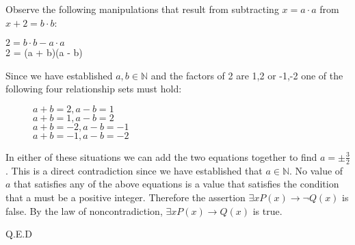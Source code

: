 Observe the following manipulations that result from subtracting $x=a\cdot a$ from $x+2=b\cdot b$: 
\begin{center}
$2 = b\cdot b - a\cdot a$ \\
2 = (a + b)(a - b)
\end{center}
Since we have established $a,b \in \mathbb{N}$ and the factors of 2 are 1,2 or -1,-2 one of the following four relationship sets must hold:
\begin{figure}[H]
\begin{center}
$a+b = 2, a-b = 1$ \\
$a+b = 1, a-b = 2$ \\
$a+b = -2, a-b = -1$ \\
$a+b = -1, a-b = -2$ \\
\end{center}
\end{figure}
In either of these situations we can add the two equations together to find $a = \pm \frac{3}{2}$. This is a direct contradiction since we have established that $a \in \mathbb{N}$. No value of $a$ that satisfies any of the above equations is a value that satisfies the condition that a must be a positive integer. Therefore the assertion $\exists x P(x) \rightarrow \lnot Q(x)$ is false. By the law of noncontradiction, $\exists x P(x) \rightarrow Q(x)$ is true.

Q.E.D

